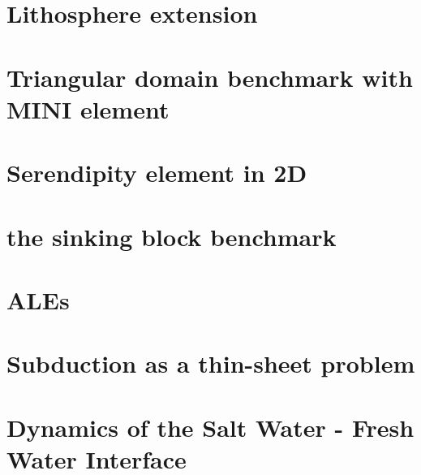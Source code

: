 \documentclass[a4paper,11pt]{report}
\begin{document}
\chapter{Lithosphere extension \label{f50}} %

\chapter{Triangular domain benchmark with MINI element\label{f51}} %

\chapter{Serendipity element in 2D \label{f52}} %

\chapter{the sinking block benchmark \label{f53}} %

\chapter{ALEs  \label{f54}} %

\chapter{Subduction as a thin-sheet problem  \label{f55}} %

\chapter{Dynamics of the Salt Water - Fresh Water Interface \label{f56}} %
\end{document}

